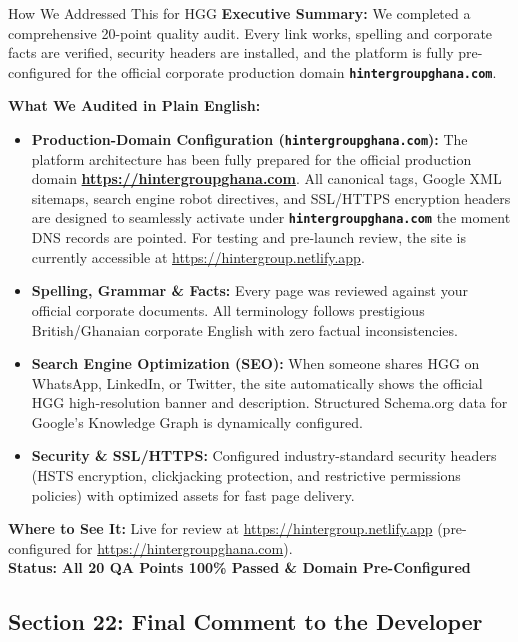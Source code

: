 \documentclass[11pt,a4paper]{article}
\begin{document}
\begin{DetailedResolutionBox}{How We Addressed This for HGG}
\textbf{Executive Summary:} We completed a comprehensive 20-point quality audit. Every link works, spelling and corporate facts are verified, security headers are installed, and the platform is fully pre-configured for the official corporate production domain \textbf{\texttt{hintergroupghana.com}}.

\textbf{What We Audited in Plain English:}
\begin{itemize}
    \item \textbf{Production-Domain Configuration (\texttt{hintergroupghana.com}):} The platform architecture has been fully prepared for the official production domain \textbf{\url{https://hintergroupghana.com}}. All canonical tags, Google XML sitemaps, search engine robot directives, and SSL/HTTPS encryption headers are designed to seamlessly activate under \textbf{\texttt{hintergroupghana.com}} the moment DNS records are pointed. For testing and pre-launch review, the site is currently accessible at \url{https://hintergroup.netlify.app}.
    \item \textbf{Spelling, Grammar \& Facts:} Every page was reviewed against your official corporate documents. All terminology follows prestigious British/Ghanaian corporate English with zero factual inconsistencies.
    \item \textbf{Search Engine Optimization (SEO):} When someone shares HGG on WhatsApp, LinkedIn, or Twitter, the site automatically shows the official HGG high-resolution banner and description. Structured Schema.org data for Google's Knowledge Graph is dynamically configured.
    \item \textbf{Security \& SSL/HTTPS:} Configured industry-standard security headers (HSTS encryption, clickjacking protection, and restrictive permissions policies) with optimized assets for fast page delivery.
\end{itemize}

\textbf{Where to See It:} Live for review at \url{https://hintergroup.netlify.app} (pre-configured for \url{https://hintergroupghana.com}). \\
\textbf{Status:} \textcolor{HGGGreen}{\textbf{All 20 QA Points 100\% Passed \& Domain Pre-Configured}}
\end{DetailedResolutionBox}

\vspace{0.3cm}

\subsection{Section 22: Final Comment to the Developer}
\end{document}
